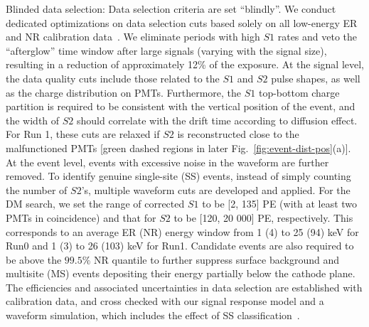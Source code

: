 \documentclass[%
 reprint,
superscriptaddress,
 amsmath,amssymb,
 aps,
 prl,
]{revtex4-1}
\begin{document}
Blinded data selection: 
Data selection criteria are set ``blindly''.
We conduct dedicated optimizations on data selection cuts based solely on all low-energy ER and NR calibration data~\cite{Luo2024_P4SignalModel}.
We eliminate periods with high $S1$ rates and veto the ``afterglow'' time window after large signals (varying with the signal size), resulting in a reduction of approximately 12\% of the exposure.
At the signal level, the data quality cuts include those related to the $S1$ and $S2$ pulse shapes, as well as the charge distribution on PMTs.
Furthermore, the $S1$ top-bottom charge partition is required to be consistent with the vertical position of the event, and the width of $S2$ should correlate with the drift time according to diffusion effect.
For Run 1, these cuts are relaxed if $S2$ is reconstructed close to the malfunctioned PMTs [green dashed regions in later Fig.~\ref{fig:event-dist-pos}(a)].
At the event level, events with excessive noise in the waveform are further removed.
To identify genuine single-site (SS) events, instead of simply counting the number of $S2$'s, multiple waveform cuts are developed and applied. 
For the DM search, we set the range of corrected $S1$ to be [2, 135] PE (with at least two PMTs in coincidence) and that for $S2$ to be [120, 20 000] PE, respectively.
This corresponds to an average ER (NR) energy window from 1 (4) to 25 (94) keV for Run0 and 1 (3) to 26 (103) keV for Run1. 
Candidate events are also required to be above the $99.5\%$ NR quantile to further suppress surface background and multisite (MS) events depositing their energy partially below the cathode plane.
The efficiencies and associated uncertainties in data selection are established with calibration data, and cross checked with our signal response model and a waveform simulation, which includes the effect of SS classification~\cite{Luo2024_P4SignalModel, Li2024_WfSim}.
\end{document}

